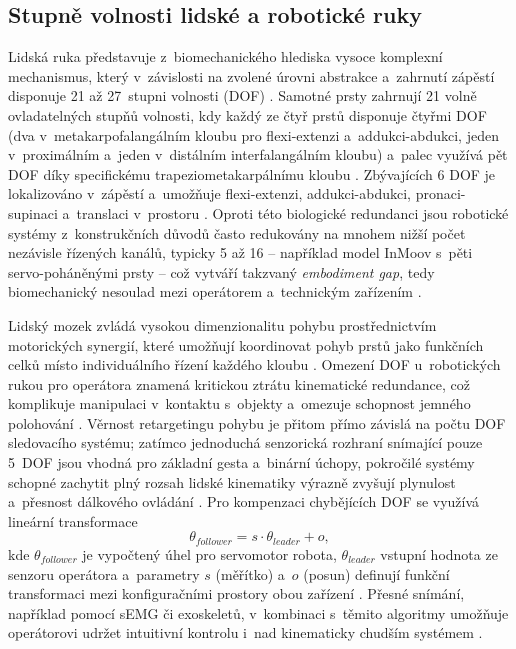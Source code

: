 \subsection{Stupně volnosti lidské a robotické ruky}
Lidská ruka představuje z~biomechanického hlediska vysoce komplexní mechanismus, který v~závislosti na zvolené úrovni abstrakce a~zahrnutí zápěstí disponuje 21 až 27~stupni volnosti (DOF) \cite{Belcamino2024, Devaraja20201222, GIUDICI2025}.
Samotné prsty zahrnují 21 volně ovladatelných stupňů volnosti, kdy každý ze čtyř prstů disponuje čtyřmi DOF (dva v~metakarpofalangálním kloubu pro flexi-extenzi a~addukci-abdukci, jeden v~proximálním a~jeden v~distálním interfalangálním kloubu) a~palec využívá pět DOF díky specifickému trapeziometakarpálnímu kloubu \cite{Belcamino2024, Capek2018, Cihak2011}.
Zbývajících 6 DOF je lokalizováno v~zápěstí a~umožňuje flexi-extenzi, addukci-abdukci, pronaci-supinaci a~translaci v~prostoru \cite{Belcamino2024}.
Oproti této biologické redundanci jsou robotické systémy z~konstrukčních důvodů často redukovány na mnohem nižší počet nezávisle řízených kanálů, typicky 5 až 16 -- například model InMoov s~pěti servo-poháněnými prsty -- což vytváří takzvaný \textit{embodiment gap}, tedy biomechanický nesoulad mezi operátorem a~technickým zařízením \cite{Devaraja20201222, GIUDICI2025, Zhang2025}.

Lidský mozek zvládá vysokou dimenzionalitu pohybu prostřednictvím motorických synergií, které umožňují koordinovat pohyb prstů jako funkčních celků místo individuálního řízení každého kloubu \cite{Mizrahi2023, Xiong2024, Zhang2025}.
Omezení DOF u~robotických rukou pro operátora znamená kritickou ztrátu kinematické redundance, což komplikuje manipulaci v~kontaktu s~objekty a~omezuje schopnost jemného polohování \cite{Belcamino2024, GIUDICI2025}.
Věrnost retargetingu pohybu je přitom přímo závislá na počtu DOF sledovacího systému; zatímco jednoduchá senzorická rozhraní snímající pouze 5~DOF jsou vhodná pro základní gesta a~binární úchopy, pokročilé systémy schopné zachytit plný rozsah lidské kinematiky výrazně zvyšují plynulost a~přesnost dálkového ovládání \cite{Belcamino2024, Zhang2025}.
Pro kompenzaci chybějících DOF se využívá lineární transformace
%
\begin{equation}
    \theta_{follower} = s \cdot \theta_{leader} + o,
\end{equation}
%
kde $\theta_{follower}$ je vypočtený úhel pro servomotor robota, $\theta_{leader}$ vstupní hodnota ze senzoru operátora a~parametry $s$ (měřítko) a~$o$ (posun) definují funkční transformaci mezi konfiguračními prostory obou zařízení \cite{Zhang2025, Mizrahi2023, GIUDICI2025}.
Přesné snímání, například pomocí sEMG či exoskeletů, v~kombinaci s~těmito algoritmy umožňuje operátorovi udržet intuitivní kontrolu i~nad kinematicky chudším systémem \cite{Xiong2024, Mizrahi2023, GIUDICI2025}.

